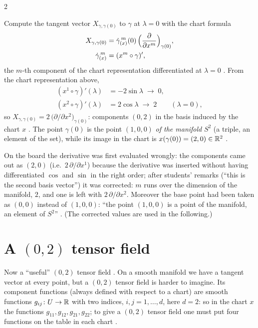 \begin{paracol}{2}
\begin{example}\label{ex:sp-tangent}
Compute the tangent vector $X_{\gamma,\gamma(0)}$ to $\gamma$ at $\lambda=0$ with the chart formula
\begin{align*}
  X_{\gamma,\gamma(0)}&=\dot\gamma^{\,m}_{(x)}(0)\,\Bigl(\frac{\partial}{\partial x^m}\Bigr)_{\gamma(0)},\\
  \dot\gamma^{\,m}_{(x)}&=(x^m\circ\gamma)' ,
\end{align*}
the $m$-th component of the chart representation differentiated at $\lambda=0$ . From the chart representation above,
\begin{align*}
  (x^1\circ\gamma)'(\lambda)&=-2\sin\lambda\;\to\;0,\\ (x^2\circ\gamma)'(\lambda)&=2\cos\lambda\;\to\;2\qquad(\lambda=0),
\end{align*}
so $X_{\gamma,\gamma(0)}=2\,\bigl(\partial/\partial x^2\bigr)_{\gamma(0)}$: components $(0,2)$ in the basis induced by the chart $x$
. The point $\gamma(0)$ is the point $(1,0,0)$ \emph{of the manifold} $S^2$ (a triple, an element of the set), while its
image in the chart is $x(\gamma(0))=(2,0)\in\mathbb{R}^2$ .
\end{example}
\begin{coursenote}
On the board the derivative was first evaluated wrongly: the components came out as $(2,0)$ (i.e.\ $2\,\partial/\partial x^1$) because the
derivative was inserted without having differentiated $\cos$ and $\sin$ in the right order; after students' remarks (``this is the second basis vector'')
it was corrected: $m$ runs over the dimension of the manifold, $2$, and one is left with $2\,\partial/\partial x^2$. Moreover the base point had
been taken as $(0,0)$ instead of $(1,0,0)$: ``the point $(1,0,0)$ is a point of the manifold, an element of $S^2$''
. (The corrected values are used in the following.)
\end{coursenote}

\section{A $(0,2)$ tensor field}\label{sec:sp-tensor}

Now a ``useful'' $(0,2)$ tensor field . On a smooth manifold we have a tangent vector at every point, but a $(0,2)$ tensor field
is harder to imagine. Its component functions (always defined with respect to a chart) are smooth functions $g_{ij}\colon U\to\mathbb{R}$ with two indices,
$i,j=1,\dots,d$, here $d=2$: so in the chart $x$ the functions $g_{11},g_{12},g_{21},g_{22}$; to give a $(0,2)$ tensor field one must put four functions
on the table in each chart .


\end{paracol}

